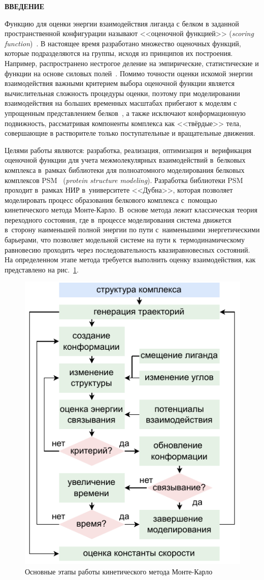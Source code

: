 \onehalfspacing
\thispagestyle{empty} 

\newpage
\renewcommand{\contentsname}{\centerline{\large СОДЕРЖАНИЕ}}
\setcounter{page}{4}
\tableofcontents

\newpage
\begin{center}
  \textbf{\large ВВЕДЕНИЕ}
\end{center}

Функцию для оценки энергии взаимодействия лиганда с белком в заданной пространственной конфигурации называют <<оценочной функцией>> (\textit{scoring function})~\cite{lizunov}. В настоящее время разработано множество оценочных функций, которые подразделяются на группы, исходя из принципов их построения. Например, распространено нестрогое деление на эмпирические, статистические и функции на основе силовых полей~\cite{ci500731a}. Помимо точности оценки искомой энергии взаимодействия важными критерием выбора оценочной функции является вычислительная сложность процедуры оценки, поэтому при моделировании взаимодействия на больших временных масштабах прибегают к моделям с упрощенным представлением белков~\cite{biom10071056}, а также исключают конформационную подвижность, рассматривая компоненты комплекса как <<твёрдые>> тела, совершающие в растворителе только поступательные и вращательные движения.

Целями работы являются: разработка, реализация, оптимизация и~верификация оценочной функции для учета межмолекулярных взаимодействий в~белковых комплекса в~рамках библиотеки для полноатомного моделирования белковых комплексов PSM~\cite{psm} (\textit{protein structure modeling}). Разработка библиотеки PSM проходит в~рамках НИР в~университете <<Дубна>>, которая позволяет моделировать процесс образования белкового комплекса с~помощью кинетического метода Монте-Карло\cite{Voter}. В~основе метода лежит классическая теория переходного состояния, где в~процессе моделирования система движется в~сторону наименьшей полной энергии по пути с~наименьшими энергетическими барьерами, что позволяет модельной системе на пути к~термодинамическому равновесию проходить через последовательность квазиравновесных состояний. На определенном этапе метода требуется выполнить оценку взаимодействия, как представлено на рис.~\ref{monte}. 

\begin{figure}[h!]
	\centering
	\includegraphics[width=0.39\linewidth]{images/kmc.pdf}
	\caption{Основные этапы работы кинетического метода Монте-Карло}
	\label{monte}
\end{figure}

